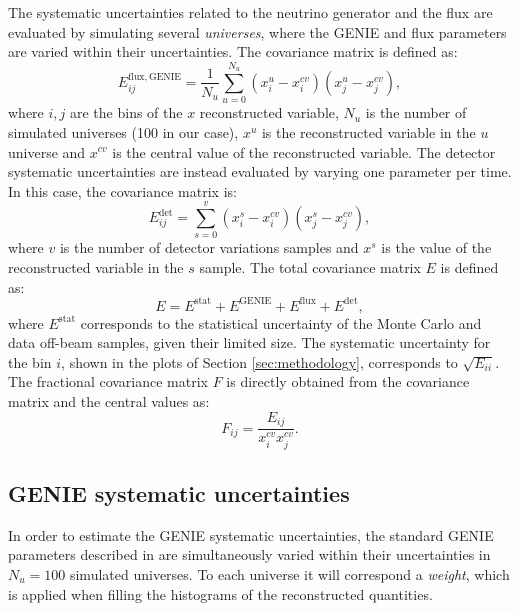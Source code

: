 The systematic uncertainties related to the neutrino generator and the flux are evaluated by simulating several \emph{universes}, where the GENIE and flux parameters are varied within their uncertainties. The covariance matrix is defined as:
\begin{equation}
    E_{ij}^{\mathrm{flux, GENIE}} = \frac{1}{N_{u}} \sum^{N_{u}}_{u=0} (x^{u}_{i} - x^{cv}_{i}) (x^{u}_{j} - x^{cv}_{j}),\label{eq:covariance}
\end{equation}
where $i,j$ are the bins of the $x$ reconstructed variable, $N_{u}$ is the number of simulated universes (100 in our case), $x^{u}$ is the reconstructed variable in the $u$ universe and $x^{cv}$ is the central value of the reconstructed variable. 
The detector systematic uncertainties are instead evaluated by varying one parameter per time. In this case, the covariance matrix is:
\begin{equation}
    E_{ij}^{\mathrm{det}} = \sum^{v}_{s=0} (x^{s}_{i} - x^{cv}_{i}) (x^{s}_{j} - x^{cv}_{j}),\label{eq:cov_det}
\end{equation}
where $v$ is the number of detector variations samples and $x^{s}$ is the value of the reconstructed variable in the $s$ sample. The total covariance matrix $E$ is defined as:
\begin{equation}
    E = E^{\mathrm{stat}} + E^{\mathrm{GENIE}} + E^{\mathrm{flux}} + E^{\mathrm{det}},\label{eq:cov_tot}
\end{equation}
where $E^{\mathrm{stat}}$ corresponds to the statistical uncertainty of the Monte Carlo and data off-beam samples, given their limited size. 
The systematic uncertainty for the bin $i$, shown in the plots of Section \ref{sec:methodology}, corresponds to $\sqrt{E_{ii}}$. The fractional covariance matrix $F$ is directly obtained from the covariance matrix and the central values as:
\begin{equation} 
    F_{ij} = \frac{E_{ij}}{x_{i}^{cv} x_{j}^{cv}}.
\end{equation}

\subsection{GENIE systematic uncertainties}
In order to estimate the GENIE systematic uncertainties, the standard GENIE parameters described in \cite{genie} are simultaneously varied within their uncertainties in $N_{u} = 100$ simulated universes. To each universe it will correspond a \emph{weight}, which is applied when filling the histograms of the reconstructed quantities.

